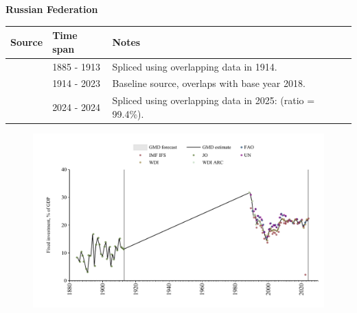 \documentclass[12pt,a4paper,landscape]{article}
\begin{document}
\begin{adjustbox}{max totalsize={\paperwidth}{\paperheight},center}
\begin{minipage}[t][\textheight][t]{\textwidth}
\vspace*{0.5cm}
{}
\begin{center}
{\Large\bfseries Russian Federation}
\end{center}
\vspace{0.5cm}
\begin{table}[H]
\centering
\small
\begin{tabular}{|l|l|l|}
\hline
\textbf{Source} & \textbf{Time span} & \textbf{Notes} \\
\hline
\rowcolor{white}\cite{JO}& 1885 - 1913 &Spliced using overlapping data in 1914.\\
\rowcolor{lightgray}\cite{WDI}& 1914 - 2023 &Baseline source, overlaps with base year 2018.\\
\rowcolor{white}\cite{IMF_IFS}& 2024 - 2024 &Spliced using overlapping data in 2025: (ratio = 99.4\%).\\
\hline
\end{tabular}
\end{table}
\begin{figure}[H]
\centering
\includegraphics[width=\textwidth,height=0.6\textheight,keepaspectratio]{graphs/RUS_finv_GDP.pdf}
\end{figure}
\end{minipage}
\end{adjustbox}
\end{document}
